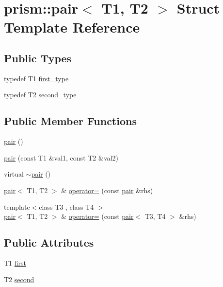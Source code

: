 \hypertarget{structprism_1_1pair}{}\section{prism\+:\+:pair$<$ T1, T2 $>$ Struct Template Reference}
\label{structprism_1_1pair}
\subsection*{Public Types}
\begin{DoxyCompactItemize}
\item 
typedef T1 \hyperlink{structprism_1_1pair_a06bf88c0e5cb126378e584c53b81a030}{first\+\_\+type}
\item 
typedef T2 \hyperlink{structprism_1_1pair_a396e6009645d217824d896f8ba71c3da}{second\+\_\+type}
\end{DoxyCompactItemize}
\subsection*{Public Member Functions}
\begin{DoxyCompactItemize}
\item 
\hyperlink{structprism_1_1pair_ad0c7fedc65f0accae2489181e9404096}{pair} ()
\item 
\hyperlink{structprism_1_1pair_a387d4e7cf4e662bb25f4fc0b613548bc}{pair} (const T1 \&val1, const T2 \&val2)
\item 
virtual \hyperlink{structprism_1_1pair_a74836fc21bb693bae7e2afaa8c3d9258}{$\sim$pair} ()
\item 
\hyperlink{structprism_1_1pair}{pair}$<$ T1, T2 $>$ \& \hyperlink{structprism_1_1pair_aba4696cd0db8c77dd81a1a5187a06956}{operator=} (const \hyperlink{structprism_1_1pair}{pair} \&rhs)
\item 
{\footnotesize template$<$class T3 , class T4 $>$ }\\\hyperlink{structprism_1_1pair}{pair}$<$ T1, T2 $>$ \& \hyperlink{structprism_1_1pair_aeb7132de798fa55081a59a88b1bd9c08}{operator=} (const \hyperlink{structprism_1_1pair}{pair}$<$ T3, T4 $>$ \&rhs)
\end{DoxyCompactItemize}
\subsection*{Public Attributes}
\begin{DoxyCompactItemize}
\item 
T1 \hyperlink{structprism_1_1pair_a71d9cdb495193c9a7fcca8fdfbedc19d}{first}
\item 
T2 \hyperlink{structprism_1_1pair_a283ff14678f78c074f5f270943727ef3}{second}
\end{DoxyCompactItemize}
